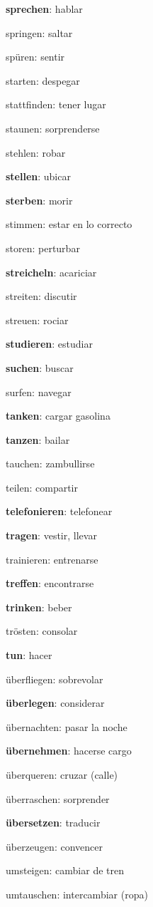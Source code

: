 \begin{multicols}{2}
\begin{myitemize}
\item \textbf{sprechen}: hablar
\item springen: saltar
\item spüren: sentir
\item starten: despegar
\item stattfinden: tener lugar
\item staunen: sorprenderse
\item stehlen: robar
\item \textbf{stellen}: ubicar
\item \textbf{sterben}: morir
\item stimmen: estar en lo correcto
\item storen: perturbar
\item \textbf{streicheln}: acariciar
\item streiten: discutir
\item streuen: rociar
\item \textbf{studieren}: estudiar
\item \textbf{suchen}: buscar
\item surfen: navegar
\item \textbf{tanken}: cargar gasolina
\item \textbf{tanzen}: bailar
\item tauchen: zambullirse
\item teilen: compartir
\item \textbf{telefonieren}: telefonear
\item \textbf{tragen}: vestir, llevar
\item trainieren: entrenarse
\item \textbf{treffen}: encontrarse
\item \textbf{trinken}: beber
\item trösten: consolar
\item \textbf{tun}: hacer
\item überfliegen: sobrevolar
\item \textbf{überlegen}: considerar
\item übernachten: pasar la noche
\item \textbf{übernehmen}: hacerse cargo
\item überqueren: cruzar (calle)
\item überraschen: sorprender
\item \textbf{übersetzen}: traducir
\item überzeugen: convencer
\item umsteigen: cambiar de tren
\item umtauschen: intercambiar (ropa)

\end{myitemize}
\end{multicols}
